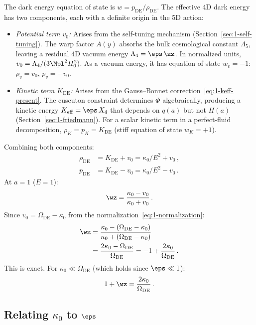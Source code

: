 The dark energy equation of state is $w = p_{\mathrm{DE}}/\rho_{\mathrm{DE}}$. The effective 4D dark energy has two components, each with a definite origin in the 5D action:
\begin{itemize}
  \item \emph{Potential term $v_0$:} Arises from the self-tuning mechanism (Section~\ref{sec:1-self-tuning}). The warp factor $A(y)$ absorbs the bulk cosmological constant $\Lambda_5$, leaving a residual 4D vacuum energy $\Lambda_4 = \eps\,\zz$. In normalized units, $v_0 = \Lambda_4/(3\Mpl^2 H_0^2)$. As a vacuum energy, it has equation of state $w_v = -1$: $\rho_v = v_0$, $p_v = -v_0$.
  \item \emph{Kinetic term $K_\mathrm{DE}$:} Arises from the Gauss--Bonnet correction~\eqref{eq:1-keff-present}. The cuscuton constraint determines $\dot\Phi$ algebraically, producing a kinetic energy $K_{\mathrm{eff}} = \eps\, X_4$ that depends on $q(a)$ but not $H(a)$ (Section~\ref{sec:1-friedmann}). For a scalar kinetic term in a perfect-fluid decomposition, $\rho_K = p_K = K_\mathrm{DE}$ (stiff equation of state $w_K = +1$).
\end{itemize}
Combining both components:
\begin{align}
\rho_{\mathrm{DE}} &= K_{\mathrm{DE}} + v_0 = \kappa_0/E^2 + v_0\,, \label{eq:1-rho-de-decomp}\\
p_{\mathrm{DE}} &= K_{\mathrm{DE}} - v_0 = \kappa_0/E^2 - v_0\,. \label{eq:1-p-de-decomp}
\end{align}
At $a = 1$ ($E = 1$):
\begin{equation}
\label{eq:1-w0-ratio}
\wz = \frac{\kappa_0 - v_0}{\kappa_0 + v_0}\,.
\end{equation}
Since $v_0 = \Omega_{\mathrm{DE}} - \kappa_0$ from the normalization~\eqref{eq:1-normalization}:
\begin{align}
\label{eq:1-w0-exact}
\wz &= \frac{\kappa_0 - (\Omega_{\mathrm{DE}} - \kappa_0)}{\kappa_0 + (\Omega_{\mathrm{DE}} - \kappa_0)} \notag\\
    &= \frac{2\kappa_0 - \Omega_{\mathrm{DE}}}{\Omega_{\mathrm{DE}}} = -1 + \frac{2\kappa_0}{\Omega_{\mathrm{DE}}}\,.
\end{align}
This is exact. For $\kappa_0 \ll \Omega_{\mathrm{DE}}$ (which holds since $\eps \ll 1$):
\begin{equation}
\label{eq:1-1pw0}
1 + \wz = \frac{2\kappa_0}{\Omega_{\mathrm{DE}}}\,.
\end{equation}

\subsection{Relating \texorpdfstring{$\kappa_0$}{kappa0} to \texorpdfstring{$\eps$}{epsilon1}}
\label{sec:1-kappa-eps}

